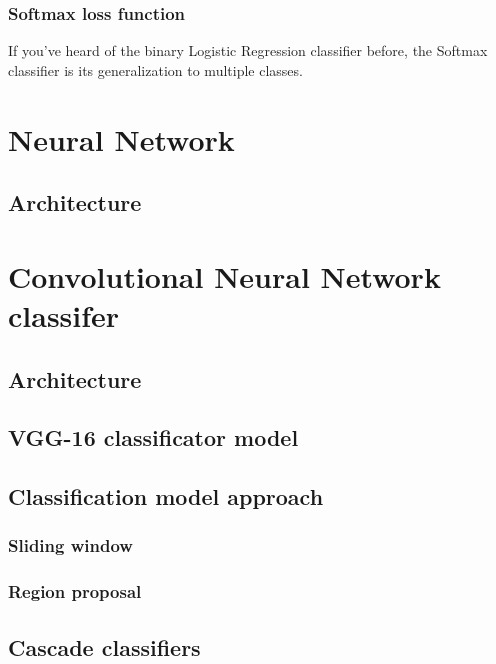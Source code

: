 \documentclass[10pt,a4paper]{article}
\begin{document}
\subsubsection{Softmax loss function}
If you’ve heard of the binary Logistic Regression classifier before, the Softmax classifier is its generalization to multiple classes.



\section{Neural Network}

\subsection{Architecture}



\section{Convolutional Neural Network classifer}

\subsection{Architecture}

\subsection{VGG-16 classificator model}

\subsection{Classification model approach}

\subsubsection{Sliding window}

\subsubsection{Region proposal}

\subsection{Cascade classifiers}
\end{document}
